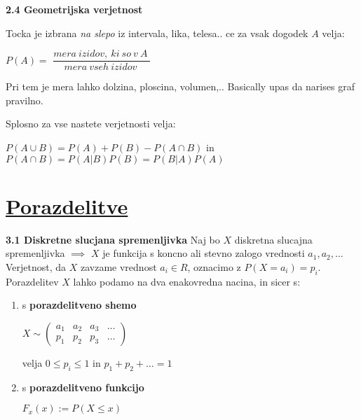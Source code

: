 \documentclass{article}
\begin{document}
\begin{multicols}{3}
\textbf{2.4 Geometrijska verjetnost}


Tocka je izbrana \textit{na slepo} iz intervala, lika, telesa.. ce za
vsak dogodek $A$ velja:
\begin{center}
    \begin{math}
        P(A) =
    \end{math}
    \smallskip
    \begin{math}
       \dfrac{
        mera\: izidov,\: ki\: so\: v\: A\:
        }
       {mera\: vseh\: izidov\:}
    \end{math}
\end{center}
Pri tem je mera lahko dolzina, ploscina, volumen,..
Basically upas da narises graf pravilno.

Splosno za vse nastete verjetnosti velja:
\begin{center}
    \begin{math}
    P(A \cup B) = P(A) + P(B) - P(A \cap B)
    \end{math} in 
    \begin{math}
        P(A \cap B) = P(A | B) P(B) = P(B | A) P(A)
    \end{math}
\end{center}

\section{\underline{Porazdelitve}}

\textbf{3.1 Diskretne slucjana spremenljivka}
Naj bo $X$ diskretna slucajna spremenljivka $\implies$ $X$ je funkcija
s koncno ali stevno zalogo  vrednosti ${ a_{1}, a_{2}, \dots}$ Verjetnost, 
da $X$ zavzame vrednost $a_{i} \in R$, oznacimo z $P(X = a_{i}) = p_{i}$. Porazdelitev
$X$ lahko podamo na dva enakovredna nacina, in sicer s:
\begin{enumerate}
    \item s \textbf{porazdelitveno shemo}
        \begin{center}
            \begin{math}
                X \sim
                \begin{pmatrix}
                    a_{1} & a_{2} & a_{3} & \dots \\
                    p_{1} & p_{2} & p_{3} & \dots
                \end{pmatrix}
            \end{math}
        \end{center}
        velja $0 \leq p_{i} \leq 1$ in $p_{1} + p_{2} + \dots = 1$
    \item s \textbf{porazdelitveno funkcijo}
        \begin{center}
            \begin{math}
                F_{x}(x) := P(X \leq x)
            \end{math}
        \end{center}
\end{enumerate}


\end{multicols}
\end{document}
